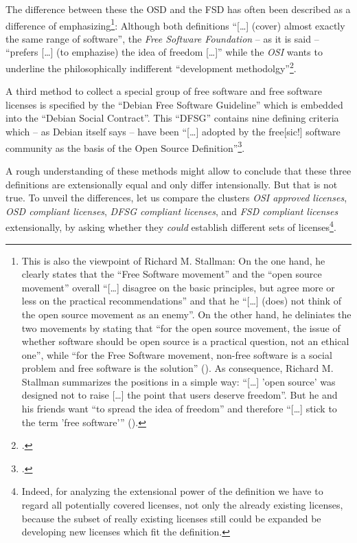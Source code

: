 The difference between these the OSD and the FSD has often been described as a
difference of emphasizing\footnote{This is also the viewpoint of Richard M.
Stallman: On the one hand, he clearly states that the \enquote{Free Software
movement} and the \enquote{open source movement} overall \enquote{[\ldots]
disagree on the basic principles, but agree more or less on the practical
recommendations} and that he \enquote{[\ldots] (does) not think of the open
source movement as an enemy}.  On the other hand, he deliniates the two
movements by stating that \enquote{for the open source movement, the issue of
whether software should be open source is a practical question, not an ethical
one}, while \enquote{for the Free Software movement, non-free software is a
social problem and free software is the solution}
(\cite[cf.][55]{Stallman1998a}). \label{RmsFsPriority} As consequence, Richard
M. Stallman summarizes the positions in a simple way: \enquote{[\ldots] 'open
source' was designed not to raise [\ldots] the point that users deserve
freedom}. But he and his friends want \enquote{to spread the idea of freedom}
and therefore \enquote{[\ldots] stick to the term 'free software'}
(\cite[][59]{Stallman1998a}).}: Although both definitions \enquote{[\ldots]
(cover) almost exactly the same range of software}, the \emph{Free Software
Foundation} -- as it is said -- \enquote{prefers [\ldots] (to emphazise) the idea
of freedom [\ldots]} while the \emph{OSI} wants to underline the philosophically
indifferent \enquote{development methodolgy}\footcite[pars pro toto:
cf.][232]{Fogel2006a}.

A third method to collect a special group of free software and free software
licenses is specified by the \enquote{Debian Free Software Guideline} which is
embedded into the \enquote{Debian Social Contract}. This \enquote{DFSG} contains
nine defining criteria which -- as Debian itself says -- have been
\enquote{[\ldots] adopted by the free[sic!] software community as the basis of
the Open Source Definition}\footcite[cf.][wp]{DFSG2013a}.

A rough understanding of these methods might allow to conclude that these three
definitions are extensionally equal and only differ intensionally.
But that is not true. To unveil the differences, let us compare the clusters
\emph{OSI approved licenses}, \emph{OSD compliant licenses}, \emph{DFSG
compliant licenses}, and \emph{FSD compliant licenses} extensionally, by asking
whether they \emph{could} establish different sets of licenses\footnote{Indeed,
for analyzing the extensional power of the definition we have to regard all
potentially covered licenses, not only the already existing licenses, because
the subset of really existing licenses still could be expanded be developing new
licenses which fit the definition.}.

